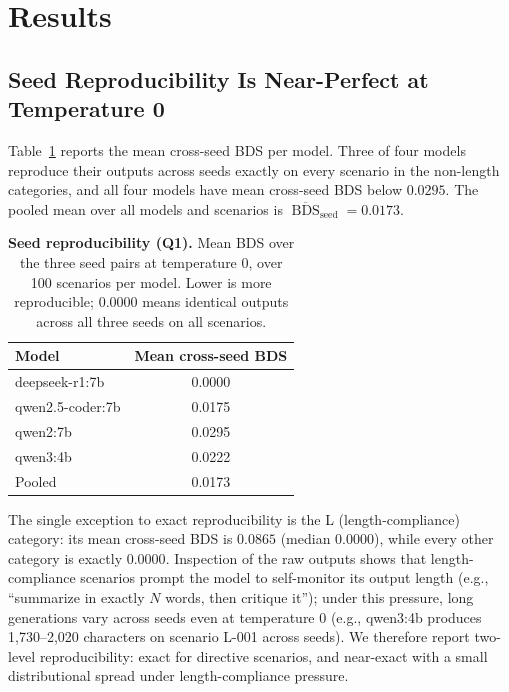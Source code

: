 \documentclass[11pt]{article}
\DeclareMathOperator{\BDS}{BDS}
\begin{document}
\section{Results}
\label{sec:results}

\subsection{Seed Reproducibility Is Near-Perfect at Temperature 0}

Table~\ref{tab:repro} reports the mean cross-seed BDS per model. Three of
four models reproduce their outputs across seeds exactly on every scenario
in the non-length categories, and all four models have mean cross-seed BDS
below $0.0295$. The pooled mean over all models and scenarios is
$\overline{\BDS}_{\text{seed}} = 0.0173$.

\begin{table}[ht]
\centering
\caption{\textbf{Seed reproducibility (Q1).} Mean BDS over the three seed
pairs at temperature 0, over 100 scenarios per model. Lower is more
reproducible; 0.0000 means identical outputs across all three seeds on all
scenarios.}
\label{tab:repro}
\begin{tabular}{@{}lc@{}}
\toprule
Model & Mean cross-seed BDS \\
\midrule
deepseek-r1:7b    & 0.0000 \\
qwen2.5-coder:7b  & 0.0175 \\
qwen2:7b          & 0.0295 \\
qwen3:4b          & 0.0222 \\
\midrule
Pooled            & 0.0173 \\
\bottomrule
\end{tabular}
\end{table}

The single exception to exact reproducibility is the \textsc{L}
(length-compliance) category: its mean cross-seed BDS is $0.0865$ (median
$0.0000$), while every other category is exactly $0.0000$. Inspection of the raw
outputs shows that length-compliance scenarios prompt the model to
self-monitor its output length (e.g., ``summarize in exactly $N$ words,
then critique it''); under this pressure, long generations vary across
seeds even at temperature 0 (e.g., qwen3:4b produces 1{,}730--2{,}020
characters on scenario \textsc{L}-001 across seeds). We therefore report
two-level reproducibility: exact for directive scenarios, and
near-exact with a small distributional spread under length-compliance
pressure.
\end{document}
